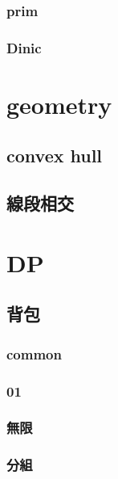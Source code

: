 \subsubsection{prim}


\subsubsection{Dinic}


\section{geometry}
\subsection{convex hull}


\subsection{線段相交}


\section{DP}

\subsection{背包}

\subsubsection{common}


\subsubsection{01}


\subsubsection{無限}


\subsubsection{分組}


